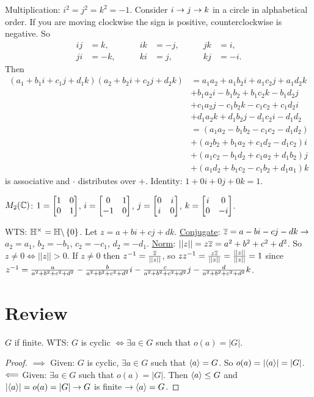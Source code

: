 \documentclass[]{article}
\begin{document}
Multiplication: $i^2=j^2=k^2 = -1$. Consider $i \rightarrow j \rightarrow k$ in a circle in alphabetical order. If you are moving clockwise the sign is positive, counterclockwise is negative.
So
\begin{align*}
	ij &= k, &\qquad ik &=-j, &\qquad jk &= i, \\
	ji &=-k, &\qquad ki &= j, &\qquad kj &=-i.
\end{align*}
Then
\begin{align*}
	(a_1+b_1i+c_1j+d_1k)(a_2+b_2i+c_2j+d_2k)
	&= a_1a_2+a_1b_2i+a_1c_2j+a_1d_2k \\
	&+ b_1a_2i-b_1b_2+b_1c_2k-b_1d_2j \\
	&+ c_1a_2j-c_1b_2k-c_1c_2+c_1d_2i \\
	&+ d_1a_2k+d_1b_2j-d_1c_2i-d_1d_2 \\
	&= (a_1a_2-b_1b_2-c_1c_2-d_1d_2) \\
	&+ (a_2b_2+b_1a_2+c_1d_2-d_1c_2)i \\
	&+ (a_1c_2-b_1d_2+c_1a_2+d_1b_2)j \\
	&+ (a_1d_2+b_1c_2-c_1b_2+d_1a_1)k
\end{align*}
is associative and $\cdot$ distributes over +.
Identity: $1+0i+0j+0k = 1$.

$M_2(\mathbb{C})$: $1 = \begin{bmatrix}1&0\\0&1\end{bmatrix}$, $i = \begin{bmatrix}0&1\\-1&0\end{bmatrix}$, $j = \begin{bmatrix}0&i\\i&0\end{bmatrix}$, $k = \begin{bmatrix}i&0\\0&-i\end{bmatrix}$.

WTS: $\mathbb{H}^\times = \mathbb{H}\backslash\left\{ 0 \right\}$.
Let $z = a+bi+cj+dk$.
\ul{Conjugate}: $\overline{z} = a-bi-cj-dk \rightarrow$ $a_2=a_1$, $b_2=-b_1$, $c_2=-c_1$, $d_2=-d_1$.
\ul{Norm}: $||z|| = z\overline{z} = a^2+b^2+c^2+d^2$.
So $z\neq0\iff ||z||>0$.
If $z\neq0$ then $z^{-1}=\frac{\overline{z}}{||z||}$, so $zz^{-1} = \frac{z\overline{z}}{||z||} = \frac{||z||}{||z||} = 1$ since $z^{-1} = \frac{a}{a^2+b^2+c^2+d^2} - \frac{b}{a^2+b^2+c^2+d^2}i - \frac{c}{a^2+b^2+c^2+d^2}j - \frac{d}{a^2+b^2+c^2+d^2}k$.

\section{Review}

\begin{example}
	$G$ if finite. WTS: $G$ is cyclic $\iff\exists a\in G$ such that $o(a)=|G|$.
\end{example}
\begin{proof}
	\ul{$\implies$} Given: $G$ is cyclic, $\exists a\in G$ such that $\langle a \rangle=G$. So $o(a) = |\langle a \rangle| = |G|$.
	\ul{$\Longleftarrow$} Given: $\exists a\in G$ such that $o(a)=|G|$. Then $\langle a \rangle\leq G$ and $|\langle a \rangle|=o(a)=|G|\rightarrow G$ is finite $\rightarrow\langle a \rangle=G$.
\end{proof}
\end{document}
